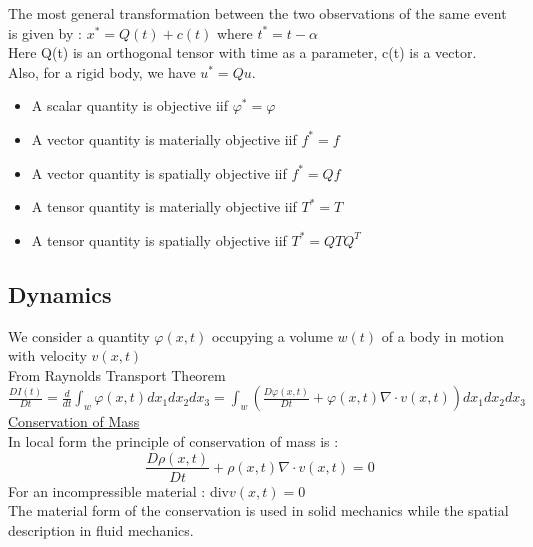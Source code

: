 \documentclass[../main.tex]{subfiles}
\begin{document}
The most general transformation between the two observations of the same event is given by : $x^* = Q(t) + c(t)$ where $t^* = t-\alpha$\\
Here Q(t) is an orthogonal tensor with time as a parameter, c(t) is a vector.\\

Also, for a rigid body, we have $u^* = Qu$.\\

\begin{itemize}
    \item A scalar quantity is objective iif $\varphi^* = \varphi$\\
    \item A vector quantity is materially objective iif $f^* = f$\\
    \item A vector quantity is spatially objective iif $f^* = Qf$\\
    \item A tensor quantity is materially objective iif $T^*= T$\\
    \item A tensor quantity is spatially objective iif $T^*= QTQ^T$\\
\end{itemize}

\subsection{Dynamics}
We consider a quantity $\varphi(x,t)$ occupying a volume $w(t)$ of a body in motion with velocity $v(x,t)$\\

From Raynolds Transport Theorem $\frac{DI(t)}{Dt} = \frac{d}{dt}\int_w \varphi(x,t) dx_1dx_2dx_3 = \int_w (\frac{D\varphi (x,t)}{Dt} + \varphi(x,t) \nabla \cdot v(x,t))dx_1dx_2dx_3$\\

\quad \underline{Conservation of Mass}\\

In local form the principle of conservation of mass is : \begin{equation}
    \frac{D\rho(x,t)}{Dt} + \rho(x,t) \nabla \cdot v(x,t)=0
\end{equation}
For an incompressible material : div$v(x,t)=0$\\

The material form of the conservation is used in solid mechanics while the spatial description in fluid mechanics.\\
\end{document}
